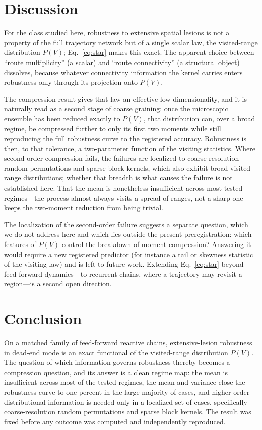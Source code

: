 \documentclass[aps,pre,twocolumn,superscriptaddress,floatfix,longbibliography]{revtex4-2}
\begin{document}
\section{Discussion}
\label{sec:discussion}

For the class studied here, robustness to extensive spatial lesions is not a
property of the full trajectory network but of a single scalar law, the visited-range
distribution $P(V)$; Eq.~\eqref{eq:star} makes this exact. The apparent choice
between ``route multiplicity'' (a scalar) and ``route connectivity'' (a structural
object) dissolves, because whatever connectivity information the kernel carries
enters robustness only through its projection onto $P(V)$.

The compression result gives that law an effective low dimensionality, and it is
naturally read as a second stage of coarse graining: once the microscopic ensemble
has been reduced exactly to $P(V)$, that distribution can, over a broad regime, be
compressed further to only its first two moments while still reproducing the full
robustness curve to the registered accuracy. Robustness is then, to that tolerance,
a two-parameter function of the visiting statistics. Where second-order compression
fails, the failures are localized to coarse-resolution random permutations and
sparse block kernels, which also exhibit broad visited-range distributions; whether
that breadth is what causes the failure is not established here. That the mean is
nonetheless insufficient across most tested regimes---the process almost always
visits a spread of ranges, not a sharp one---keeps the two-moment reduction from
being trivial.

The localization of the second-order failure suggests a separate question, which we
do not address here and which lies outside the present preregistration: which
features of $P(V)$ control the breakdown of moment compression? Answering it would
require a new registered predictor (for instance a tail or skewness statistic of the
visiting law) and is left to future work. Extending Eq.~\eqref{eq:star} beyond
feed-forward dynamics---to recurrent chains, where a trajectory may revisit a
region---is a second open direction.

\section{Conclusion}

On a matched family of feed-forward reactive chains, extensive-lesion robustness in
dead-end mode is an exact functional of the visited-range distribution $P(V)$. The
question of which information governs robustness thereby becomes a compression
question, and its answer is a clean regime map: the mean is insufficient across most
of the tested regimes, the mean and variance close the robustness curve to one
percent in the large majority of cases, and higher-order distributional information
is needed only in a localized set of cases, specifically coarse-resolution random
permutations and sparse block kernels. The result was fixed before any outcome was computed and
independently reproduced.
\end{document}
